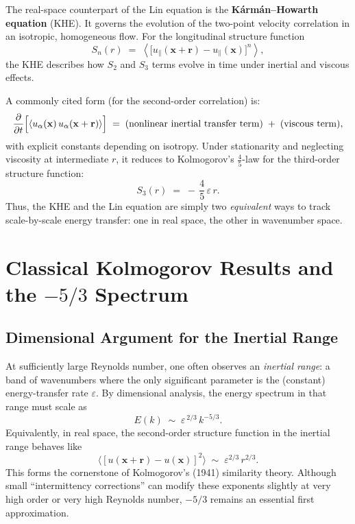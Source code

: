 \documentclass[12pt,a4paper]{article}
\newcommand\x{\mathbf{x}}    %
\begin{document}
The real-space counterpart of the Lin equation is the \textbf{Kármán–Howarth equation} (KHE).  It governs the evolution of the two-point velocity correlation in an isotropic, homogeneous flow.  For the longitudinal structure function 
\begin{equation}
S_{n}(r)
\;=\;
\left\langle
\bigl[u_{\parallel}(\x+\mathbf{r}) - u_{\parallel}(\x)\bigr]^n
\right\rangle,
\end{equation}
the KHE describes how \(S_{2}\) and \(S_{3}\) terms evolve in time under inertial and viscous effects.

A commonly cited form (for the second-order correlation) is:
\begin{equation}
\frac{\partial}{\partial t}\Bigl[\langle u_\alpha(\x)\,u_\alpha(\x+\mathbf{r})\rangle\Bigr]
\;=\;
\text{(nonlinear inertial transfer term)}
\;+\;
\text{(viscous term)},
\label{eq:KHE_general}
\end{equation}
with explicit constants depending on isotropy.  Under stationarity and neglecting viscosity at intermediate \(r\), it reduces to Kolmogorov’s \(\tfrac{4}{5}\)-law for the third-order structure function:
\begin{equation}
S_{3}(r)
\;=\;
-\,\frac{4}{5}\,\varepsilon\,r.
\end{equation}
Thus, the KHE and the Lin equation are simply two \emph{equivalent} ways to track scale-by-scale energy transfer: one in real space, the other in wave\-number space.

\section{Classical Kolmogorov Results and the \boldmath$-5/3$ Spectrum}

\subsection{Dimensional Argument for the Inertial Range}

At sufficiently large Reynolds number, one often observes an \emph{inertial range}: a band of wave\-numbers where the only significant parameter is the (constant) energy-transfer rate \(\varepsilon\).  By dimensional analysis, the energy spectrum in that range must scale as
\begin{equation}
E(k)
\;\sim\;
\varepsilon^{\,2/3}\,
k^{-5/3}.
\label{eq:KolmogorovSpectrum}
\end{equation}
Equivalently, in real space, the second-order structure function in the inertial range behaves like 
\begin{equation}
\langle [u(\x + \mathbf{r}) - u(\x)]^{2}\rangle
\;\sim\;
\varepsilon^{2/3}\,r^{2/3}.
\end{equation}
This forms the cornerstone of Kolmogorov’s (1941) similarity theory.  Although small “intermittency corrections” can modify these exponents slightly at very high order or very high Reynolds number, \(-5/3\) remains an essential first approximation.
\end{document}
